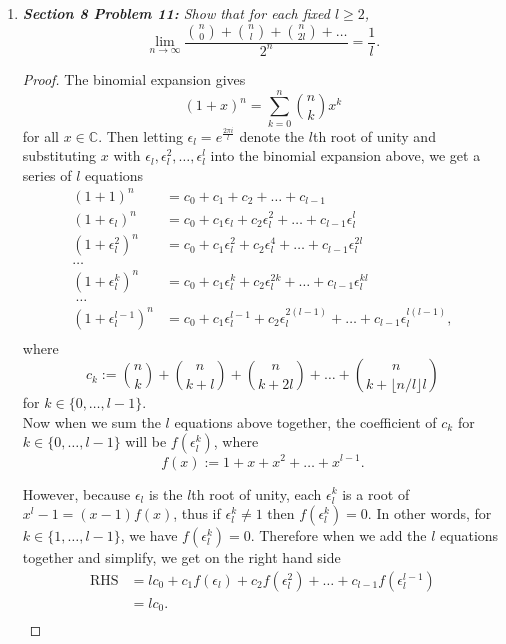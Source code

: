 \documentclass{article}
\begin{document}
\begin{enumerate}[label={\bf Q\arabic*:}]
\begin{proof}
      Similarly, when $k$ is even, $\pi$ will map odd-sized subsets of $J$
      with not more than $k$ elements will injectively to even-sized
      subsets of $J$ with not more than $k$ elements, implying that there
      are more eved-sized than odd-sized subsets of $J$ with not more than
      $k$ elements. \\
    \end{proof}

  \item \it \textbf{Section 8 Problem 11:} Show that for each fixed
    $l\geq2$,
    \[\lim_{n\rightarrow\infty}
    \frac{\binom{n}{0}+\binom{n}{l}+\binom{n}{2l}+\ldots}{2^n}
    =\frac{1}{l}.\]

    \begin{proof}
      The binomial expansion gives
      \[(1+x)^n =\sum_{k=0}^n\binom{n}{k}x^k\]
      for all $x\in\mathbb{C}$. Then letting $\epsilon_l=e^{\frac{2\pi
      i}{l}}$ denote the $l$th root of unity and substituting $x$ with
      $\epsilon_l,\epsilon_l^2,\ldots,\epsilon_l^l$ into the binomial
      expansion above, we get a series of $l$ equations
      \begin{align*}
        (1+1)^n           &=c_0+c_1+c_2+\ldots+c_{l-1}\\
        (1+\epsilon_l)^n   &=c_0+c_1\epsilon_l  +c_2\epsilon_l^2
          +\ldots+c_{l-1}\epsilon_l^l\\
        (1+\epsilon_l^2)^n &=c_0+c_1\epsilon_l^2+c_2\epsilon_l^4
          +\ldots+c_{l-1}\epsilon_l^{2l}\\
        \ldots\\
        (1+\epsilon_l^k)^n &=c_0+c_1\epsilon_l^k+c_2\epsilon_l^{2k}
          +\ldots+c_{l-1}\epsilon_l^{kl}\\\
        \ldots\\
        (1+\epsilon_l^{l-1})^n
          &=c_0+c_1\epsilon_l^{l-1}+c_2\epsilon_l^{2(l-1)}
          +\ldots+c_{l-1}\epsilon_l^{l(l-1)},\\
      \end{align*}
      where
      \[c_k :=\binom{n}{k}+\binom{n}{k+l}+\binom{n}{k+2l}+
      \ldots+\binom{n}{k+\lfloor n/l\rfloor l}\]
      for $k\in\{0,\ldots,l-1\}$. \\

      Now when we sum the $l$ equations above together, the coefficient of
      $c_k$ for $k\in\{0,\ldots,l-1\}$ will be $f(\epsilon_l^k)$, where
      \[f(x):=1+x+x^2+\ldots+x^{l-1}.\]

      However, because $\epsilon_l$ is the $l$th root of unity,
      each $\epsilon_l^k$ is a root of $x^l-1=(x-1)f(x)$, thus if
      $\epsilon_l^k\neq1$ then $f(\epsilon_l^k)=0$. In other words, for
      $k\in\{1,\ldots,l-1\}$, we have $f(\epsilon_l^k)=0$. Therefore when
      we add the $l$ equations together and simplify, we get on the
      right hand side
      \begin{align*}
        \text{RHS} &=lc_0 +c_1f(\epsilon_l) +c_2f(\epsilon_l^2) +\ldots
          +c_{l-1}f(\epsilon_l^{l-1})\\
        &=lc_0.\\
      \end{align*}


\end{proof}
\end{enumerate}
\end{document}
